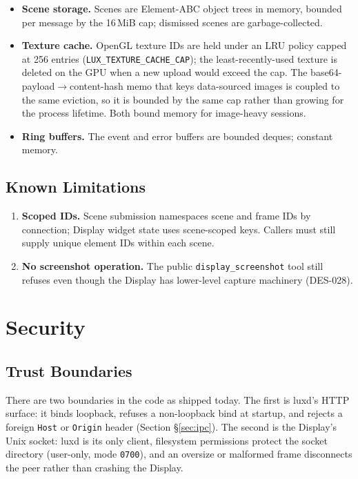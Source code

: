 \documentclass[a4paper,10pt]{article}
\newcommand{\tool}[1]{\texttt{#1}}
\begin{document}
\begin{itemize}
  \item \textbf{Scene storage.} Scenes are Element-ABC object trees in
    memory, bounded per message by the 16\,MiB cap; dismissed scenes are
    garbage-collected.
  \item \textbf{Texture cache.}  OpenGL texture IDs are held under an LRU
    policy capped at 256 entries (\texttt{LUX\_TEXTURE\_CACHE\_CAP}); the
    least-recently-used texture is deleted on the GPU when a new upload
    would exceed the cap. The base64-payload$\to$content-hash memo that
    keys data-sourced images is coupled to the same eviction, so it is
    bounded by the same cap rather than growing for the process lifetime.
    Both bound memory for image-heavy sessions.
  \item \textbf{Ring buffers.}  The event and error buffers are bounded
    deques; constant memory.
\end{itemize}

\subsection{Known Limitations}

\begin{enumerate}
  \item \textbf{Scoped IDs.} Scene submission namespaces scene and frame IDs
    by connection; Display widget state uses scene-scoped keys. Callers
    must still supply unique element IDs within each scene.
  \item \textbf{No screenshot operation.} The public
    \tool{display\_screenshot} tool still refuses even though the Display
    has lower-level capture machinery (DES-028).
\end{enumerate}

\section{Security}

\subsection{Trust Boundaries}

There are two boundaries in the code as shipped today.  The first is
luxd's HTTP surface: it binds loopback, refuses a non-loopback bind at
startup, and rejects a foreign \texttt{Host} or \texttt{Origin} header
(Section \S\ref{sec:ipc}).  The second is the Display's Unix socket: luxd
is its only client, filesystem permissions protect the socket directory
(user-only, mode \texttt{0700}), and an oversize or malformed frame
disconnects the peer rather than crashing the Display.
\end{document}
